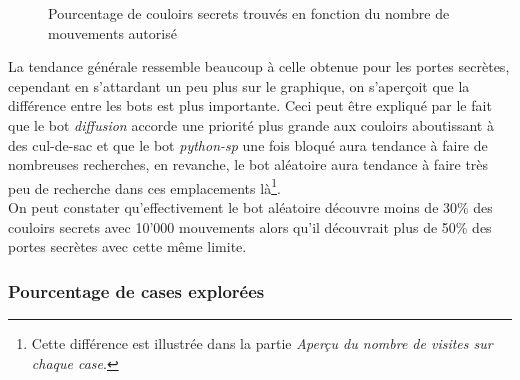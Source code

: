 \documentclass[a4paper,12pt]{article}
\begin{document}
\begin{figure}[H]
  \caption{\label{fig:scorrs_found} Pourcentage de couloirs secrets trouvés en
    fonction du nombre de mouvements autorisé}
\end{figure}

La tendance générale ressemble beaucoup à celle obtenue pour les portes
secrètes, cependant en s'attardant un peu plus sur le graphique, on s'aperçoit
que la différence entre les bots est plus importante. Ceci peut être expliqué
par le fait que le bot {\em diffusion} accorde une priorité plus grande aux
couloirs aboutissant à des cul-de-sac et que le bot {\em python-sp} une fois
bloqué aura tendance à faire de nombreuses recherches, %
en revanche, le bot aléatoire aura tendance à faire très peu de recherche dans
ces emplacements là\footnote{Cette différence est illustrée dans la partie
{\em Aperçu du nombre de visites sur chaque case}.}.
\\
On peut constater qu'effectivement le bot aléatoire découvre moins de 30\% des
couloirs secrets avec 10'000 mouvements alors qu'il découvrait plus de 50\% des
portes secrètes avec cette même limite.

\subsubsection{Pourcentage de cases explorées}
\end{document}
